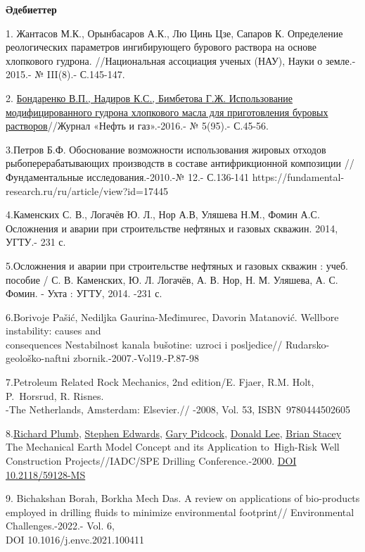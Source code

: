 \begin{center}
{\bfseries Әдебиеттер}
\end{center}

\begin{references}

1. Жантасов М.К., Орынбасаров А.К., Лю Цинь Цзе, Сапаров К. Определение
реологических параметров ингибирующего бурового раствора на основе
хлопкового гудрона. //Национальная ассоциация ученых (НАУ), Науки о
земле.- 2015.- № III(8).- С.145-147.

2.
\href{http://neft-gas.kz/f/no_5_2016_neft_i_gaz-dlya_sajta2-1.pdf}{Бондаренко
В.П., Надиров К.С., Бимбетова Г.Ж. Использование модифицированного
гудрона хлопкового масла для приготовления буровых растворов}//Журнал
«Нефть и газ».-2016.- № 5(95).- С.45-56.

3.Петров Б.Ф. Обоснование возможности использования жировых отходов
рыбоперерабатывающих производств в составе антифрикционной композиции //
Фундаментальные исследования.-2010.-№ 12.- С.136-141
https://fundamental-research.ru/ru/article/view?id=17445

4.Каменских С. В., Логачёв Ю. Л., Нор А.В, Уляшева Н.М., Фомин А.С.
Осложнения и аварии при строительстве нефтяных и газовых скважин. 2014,
УГТУ.- 231 с.

5.Осложнения и аварии при строительстве нефтяных и газовых скважин :
учеб. пособие / С. В. Каменских, Ю. Л. Логачёв, А. В. Нор, Н. М.
Уляшева, А. С. Фомин. - Ухта : УГТУ, 2014. -231 с.

6.Borivoje Pašić, Nediljka Gaurina-Međimurec, Davorin Matanović.
Wellbore instability: causes and \\consequences Nestabilnost kanala
bušotine: uzroci i posljedice// Rudarsko-geološko-naftni
zbornik.-2007.-Vol19.-P.87-98

7.Petroleum Related Rock Mechanics, 2nd edition/E. Fjaer, R.M. Holt,
P.~Horsrud, R. Risnes. \\-The Netherlands, Amsterdam: Elsevier.// -2008,
Vol. 53, ISBN~9780444502605

8.\href{javascript:;}{Richard Plumb}, \href{javascript:;}{Stephen
Edwards}, \href{javascript:;}{Gary Pidcock}, \href{javascript:;}{Donald
Lee}, \href{javascript:;}{Brian Stacey} The Mechanical Earth Model
Concept and its Application to~High-Risk Well Construction
Projects//IADC/SPE Drilling Conference.-2000.
\href{https://doi.org/10.2118/59128-MS}{DOI 10.2118/59128-MS}

9. Bichakshan Borah, Borkha Mech Das. A review on applications of
bio-products employed in drilling fluids to minimize environmental
footprint// Environmental Challenges.-2022.- Vol. 6, \\DOI
10.1016/j.envc.2021.100411


\end{references}
